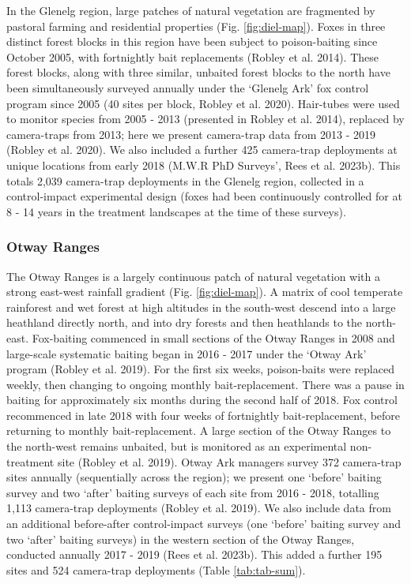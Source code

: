 \documentclass[preprint, 3p, authoryear]{elsarticle} %
\begin{document}
In the Glenelg region, large patches of natural vegetation are fragmented by pastoral farming and residential properties (Fig. \ref{fig:diel-map}). Foxes in three distinct forest blocks in this region have been subject to poison-baiting since October 2005, with fortnightly bait replacements (Robley et al. 2014). These forest blocks, along with three similar, unbaited forest blocks to the north have been simultaneously surveyed annually under the `Glenelg Ark' fox control program since 2005 (40 sites per block, Robley et al. 2020). Hair-tubes were used to monitor species from 2005 - 2013 (presented in Robley et al. 2014), replaced by camera-traps from 2013; here we present camera-trap data from 2013 - 2019 (Robley et al. 2020). We also included a further 425 camera-trap deployments at unique locations from early 2018 (M.W.R PhD Surveys', Rees et al. 2023b). This totals 2,039 camera-trap deployments in the Glenelg region, collected in a control-impact experimental design (foxes had been continuously controlled for at 8 - 14 years in the treatment landscapes at the time of these surveys).

\hypertarget{otway-ranges}{%
\subsubsection{Otway Ranges}\label{otway-ranges}}

The Otway Ranges is a largely continuous patch of natural vegetation with a strong east-west rainfall gradient (Fig. \ref{fig:diel-map}). A matrix of cool temperate rainforest and wet forest at high altitudes in the south-west descend into a large heathland directly north, and into dry forests and then heathlands to the north-east. Fox-baiting commenced in small sections of the Otway Ranges in 2008 and large-scale systematic baiting began in 2016 - 2017 under the `Otway Ark' program (Robley et al. 2019). For the first six weeks, poison-baits were replaced weekly, then changing to ongoing monthly bait-replacement. There was a pause in baiting for approximately six months during the second half of 2018. Fox control recommenced in late 2018 with four weeks of fortnightly bait-replacement, before returning to monthly bait-replacement. A large section of the Otway Ranges to the north-west remains unbaited, but is monitored as an experimental non-treatment site (Robley et al. 2019). Otway Ark managers survey 372 camera-trap sites annually (sequentially across the region); we present one `before' baiting survey and two `after' baiting surveys of each site from 2016 - 2018, totalling 1,113 camera-trap deployments (Robley et al. 2019). We also include data from an additional before-after control-impact surveys (one `before' baiting survey and two `after' baiting surveys) in the western section of the Otway Ranges, conducted annually 2017 - 2019 (Rees et al. 2023b). This added a further 195 sites and 524 camera-trap deployments (Table \ref{tab:tab-sum}).
\end{document}
